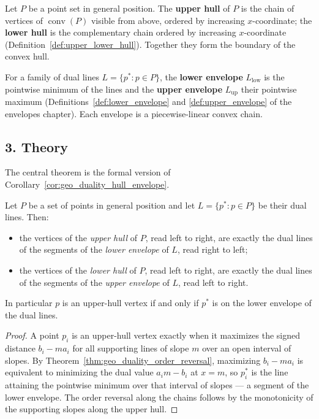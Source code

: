 \begin{definition}\label{def:geo_duality_upper_lower_hull}
  Let $P$ be a point set in general position. The \textbf{upper hull} of
  $P$ is the chain of vertices of $\operatorname{conv}(P)$ visible from
  above, ordered by increasing $x$-coordinate; the \textbf{lower hull} is
  the complementary chain ordered by increasing $x$-coordinate
  (Definition~\ref{def:upper_lower_hull}). Together they form the boundary
  of the convex hull.
\end{definition}

\begin{definition}\label{def:geo_duality_envelope_pair}
  For a family of dual lines $L = \{p^* : p \in P\}$, the \textbf{lower
  envelope} $L_{\text{low}}$ is the pointwise minimum of the lines and the
  \textbf{upper envelope} $L_{\text{up}}$ their pointwise maximum
  (Definitions~\ref{def:lower_envelope} and \ref{def:upper_envelope} of the
  envelopes chapter). Each envelope is a piecewise-linear convex chain.
\end{definition}

\subsection{3. Theory}

The central theorem is the formal version of
Corollary~\ref{cor:geo_duality_hull_envelope}.

\begin{theorem}\label{thm:geo_duality_upper_hull_lower_envelope}
  Let $P$ be a set of points in general position and let $L = \{p^* : p \in
  P\}$ be their dual lines. Then:
  \begin{itemize}
    \item the vertices of the \emph{upper hull} of $P$, read left to right,
      are exactly the dual lines of the segments of the \emph{lower
      envelope} of $L$, read right to left;
    \item the vertices of the \emph{lower hull} of $P$, read left to right,
      are exactly the dual lines of the segments of the \emph{upper
      envelope} of $L$, read left to right.
  \end{itemize}
  In particular $p$ is an upper-hull vertex if and only if $p^*$ is on the
  lower envelope of the dual lines.
\end{theorem}

\begin{proof}
  A point $p_i$ is an upper-hull vertex exactly when it maximizes the signed
  distance $b_i - m a_i$ for all supporting lines of slope $m$ over an open
  interval of slopes. By Theorem~\ref{thm:geo_duality_order_reversal},
  maximizing $b_i - ma_i$ is equivalent to minimizing the dual value
  $a_i m - b_i$ at $x = m$, so $p_i^*$ is the line attaining the pointwise
  minimum over that interval of slopes --- a segment of the lower envelope.
  The order reversal along the chains follows by the monotonicity of the
  supporting slopes along the upper hull.
\end{proof}


